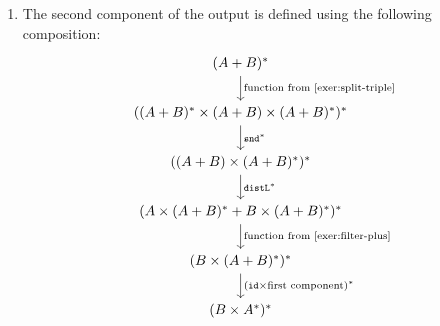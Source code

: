 {\begin{enumerate}
\[\begin{tikzcd}
\\
A^*
\end{tikzcd}
\]
\item The second component of the output is defined using the following composition:
\[
\begin{tikzcd}
(A+B)^*
\ar[d, "{\text{function from \cref{exer:split-triple}}}"]
\\
((A+B)^* \times (A+B) \times (A+B)^*)^* 
\ar[d, "\sndterm^*"]
\\
( (A+B) \times (A+B)^*)^* 
\ar[d,"\distlterm^*"]
\\
(A \times (A+B)^* + B \times (A+B)^*)^*
\ar[d, "{\text{function from \cref{exer:filter-plus}}}"]
\\
(B \times (A+B)^*)^*
\ar[d, "{(\idterm \times \text{first component})^*}"]
\\
(B \times A^*)^*
\end{tikzcd}
\]
\end{enumerate}
}

